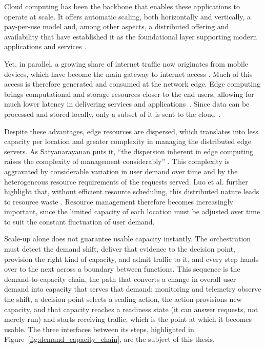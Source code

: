 ﻿\documentclass[12pt,reqno,twoside]{amsbook}
\begin{document}
Cloud computing has been the backbone that enables these applications to
operate at scale. It offers automatic scaling, both horizontally
and vertically, a pay-per-use model and, among other aspects, a
distributed offering and availability that have established it as the
foundational layer supporting modern applications and services
\parencite{Gurung2026CloudRevolutionTracingOriginsRise}.

Yet, in parallel, a growing share of internet traffic now originates from
mobile devices, which have become the main gateway to internet access
\parencite{Gaudiaut2026MobileTrafficShare}. Much of this access is
therefore generated and consumed at the network edge. Edge computing
brings computational and storage resources closer to the end users,
allowing for much lower latency in delivering services and
applications~\parencite{Cao2020OverviewEdgeComputingResearch,Satyanarayanan2017EmergenceEdgeComputing}.
Since data can be processed and stored locally, only a subset of it is
sent to the cloud~\parencite{Cao2020OverviewEdgeComputingResearch}. 

Despite these advantages, edge resources are dispersed, which translates
into less capacity per location and greater complexity in managing the
distributed edge servers. As Satyanarayanan puts it, \enquote{the dispersion inherent in
edge computing raises the complexity of management considerably}
\parencite[p.~37]{Satyanarayanan2017EmergenceEdgeComputing}. This complexity is
aggravated by considerable variation in user demand over time and by the
heterogeneous resource requirements of the requests served. Luo et al. further
highlight that, without efficient resource scheduling, this distributed nature
leads to resource waste \parencite{Luo2021ResourceSchedulingEdgeComputingSurvey}.
Resource management therefore becomes increasingly important, since the limited
capacity of each location must be adjusted over time to suit the constant
fluctuation of user demand.

Scale-up alone does not guarantee usable capacity instantly. The
orchestration must detect the demand shift, deliver that evidence to the
decision point, provision the right kind of capacity, and admit traffic to it,
and every step hands over to the next across a boundary between functions.
This sequence is the demand-to-capacity chain, the path that converts a change
in overall user demand into capacity that serves that demand: monitoring and
telemetry observe the shift, a decision point selects a scaling action, the
action provisions new capacity, and that capacity reaches a readiness state
(it can answer requests, not merely run) and starts receiving traffic, which
is the point at which it becomes usable. The three interfaces between its
steps, highlighted in Figure~\ref{fig:demand_capacity_chain}, are the subject
of this thesis.
\end{document}
